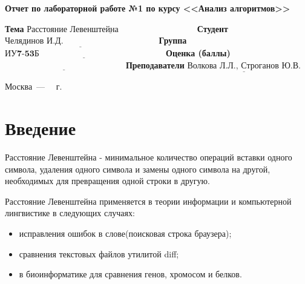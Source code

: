 \documentclass[12pt]{report}
\begin{document}
\begin{titlepage}
	\begin{center}
		\Large\textbf{Отчет по лабораторной работе №1 по курсу <<Анализ алгоритмов>>}
	\end{center}
	\newline\newline 
	\newline
	
	\noindent\textbf{Тема} $\underline{\textbf{Расстояние Левенштейна~~~~~~~~~~~~~~~~~~~~~~~~~~~}}$\newline\newline
	\noindent\textbf{Студент} $\underline{\textbf{Челядинов И.Д.~~~~~~~~~~~~~~~~~~~~~~~~~~~~~~~~~}}$\newline\newline
	\noindent\textbf{Группа} $\underline{\textbf{ИУ7-53Б~~~~~~~~~~~~~~~~~~~~~~~~~~~~~~~~~~~~~~~~~~~~}}$\newline\newline
	\noindent\textbf{Оценка (баллы)} $\underline{\textbf{~~~~~~~~~~~~~~~~~~~~~~~~~~~~~~~~~~~~~~~~~~}}$\newline\newline
	\noindent\textbf{Преподаватели} $\underline{\textbf{Волкова Л.Л., Строганов Ю.В.}}$\newline
	
	\begin{center}
		\vfill
		Москва~---~\the\year
		~г.
	\end{center}
 \restoregeometry
\end{titlepage}


\tableofcontents

\newpage
\chapter*{Введение}
\textbfb Расстояние Левенштейна - минимальное количество операций вставки одного символа, удаления одного символа и замены одного символа на другой, необходимых для превращения одной строки в другую.

Расстояние Левенштейна применяется в теории информации и компьютерной лингвистике в следующих случаях:

\begin{itemize}
	\item исправления ошибок в слове(поисковая строка браузера);
	\item сравнения текстовых файлов утилитой diff;
	\item в биоинформатике для сравнения генов, хромосом и белков.
\end{itemize}
\end{document}
